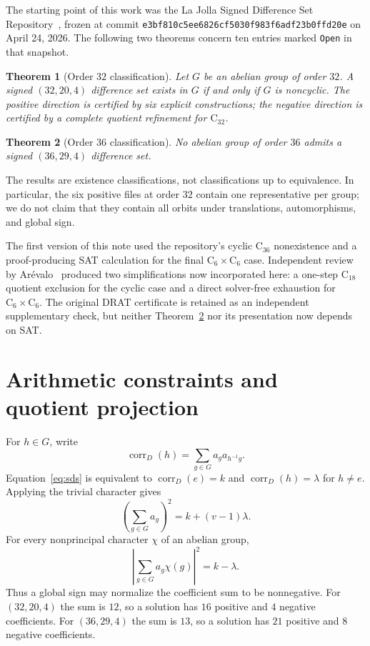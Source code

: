 \documentclass[11pt]{article}
\newtheorem{theorem}{Theorem}
\theoremstyle{remark}
\newcommand{\C}{\mathrm{C}}
\newcommand{\corr}{\operatorname{corr}}
\begin{document}
The starting point of this work was the La Jolla Signed Difference Set
Repository~\cite{repository}, frozen at commit
\texttt{e3bf810c5ee6826cf5030f983f6adf23b0ffd20e} on April 24, 2026.
The following two theorems concern ten entries marked \texttt{Open} in that
snapshot.

\begin{theorem}[Order $32$ classification]\label{thm:32}
Let $G$ be an abelian group of order $32$.  A signed $(32,20,4)$ difference
set exists in $G$ if and only if $G$ is noncyclic.  The positive direction is
certified by six explicit constructions; the negative direction is certified
by a complete quotient refinement for $\C_{32}$.
\end{theorem}

\begin{theorem}[Order $36$ classification]\label{thm:36}
No abelian group of order $36$ admits a signed $(36,29,4)$ difference set.
\end{theorem}

The results are existence classifications, not classifications up to
equivalence.  In particular, the six positive files at order $32$ contain one
representative per group; we do not claim that they contain all orbits under
translations, automorphisms, and global sign.

The first version of this note used the repository's cyclic $\C_{36}$
nonexistence and a proof-producing SAT calculation for the final
$\C_6\times\C_6$ case.  Independent review by Ar\'evalo~\cite{arevalo-review}
produced two simplifications now incorporated here: a one-step $\C_{18}$
quotient exclusion for the cyclic case and a direct solver-free exhaustion
for $\C_6\times\C_6$.  The original DRAT certificate is retained as an
independent supplementary check, but neither Theorem~\ref{thm:36} nor its
presentation now depends on SAT.

\section{Arithmetic constraints and quotient projection}

For $h\in G$, write
\[
    \corr_D(h)=\sum_{g\in G}a_g a_{h^{-1}g}.
\]
Equation~\eqref{eq:sds} is equivalent to
$\corr_D(e)=k$ and $\corr_D(h)=\lambda$ for $h\ne e$.
Applying the trivial character gives
\begin{equation}\label{eq:augmentation}
    \left(\sum_{g\in G}a_g\right)^2=k+(v-1)\lambda.
\end{equation}
For every nonprincipal character $\chi$ of an abelian group,
\begin{equation}\label{eq:character}
    \left|\sum_{g\in G}a_g\chi(g)\right|^2=k-\lambda.
\end{equation}
Thus a global sign may normalize the coefficient sum to be nonnegative.
For $(32,20,4)$ the sum is $12$, so a solution has $16$ positive and $4$
negative coefficients.  For $(36,29,4)$ the sum is $13$, so a solution has
$21$ positive and $8$ negative coefficients.
\end{document}

